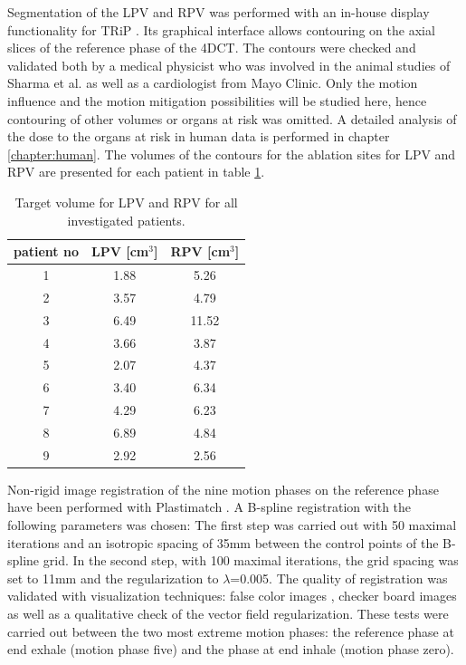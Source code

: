\documentclass[type=dr, dr=rernat, accentcolor=tud7b,colorbacktitle, bigchapter, openright, twoside, 12pt ]{tudthesis}
\begin{document}
\newpage

Segmentation of the LPV and RPV was performed with an in-house display functionality for TRiP \cite{Hil09}. Its graphical interface 
allows contouring on the axial slices of the reference phase of the 4DCT. The contours were checked and validated both by a medical physicist 
who was involved in the animal studies of Sharma et al. \cite{Sha10} as well as a cardiologist from Mayo Clinic. Only the motion influence 
and the motion mitigation possibilities will be studied here, hence contouring of other volumes or organs at risk was omitted. A detailed 
analysis of the dose to the organs at risk in human data is performed in chapter \ref{chapter:human}. The volumes of the contours for the 
ablation sites for LPV and RPV are presented for each patient in table \ref{tab:volume}. 

\begin{table}[H]
  \centering
  \caption{Target volume for LPV and RPV for all investigated patients.}
  \begin{tabular}{|c|c|c|}
    \hline\hline
    patient no & LPV [cm$^{3}$] & RPV [cm$^{3}$]\\
    \hline
    1 & 1.88 & 5.26 \\
    2 & 3.57 & 4.79 \\
    3 & 6.49 & 11.52 \\
    4 & 3.66 & 3.87 \\
    5 & 2.07 & 4.37 \\
    6 & 3.40 & 6.34 \\
    7 & 4.29 & 6.23 \\
    8 & 6.89 & 4.84 \\
    9 & 2.92 & 2.56 \\
    \hline\hline
  \end{tabular}
  \label{tab:volume}
\end{table}

Non-rigid image registration of the nine motion phases on the reference phase have been performed with Plastimatch \cite{Sharp07} \cite{Shack10}. 
A B-spline registration with the following parameters was chosen: The first step was carried out with 50 maximal iterations and an isotropic 
spacing of 35mm between the control points of the B-spline grid. In the second step, with 100 maximal iterations, the grid 
spacing was set to 11mm and the regularization to $\lambda$=0.005. 
The quality of registration was validated with visualization techniques: false color images \cite{Bro07}, checker board images 
\cite{Bro07} as well as a qualitative check of the vector field regularization. These tests were carried out between the two most extreme 
motion phases: the reference phase at end exhale (motion phase five) and the phase at end inhale (motion phase zero).
\end{document}
